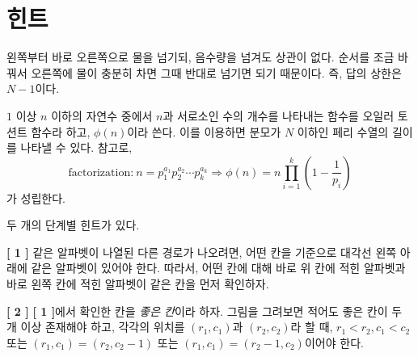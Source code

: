 \newpage

\section{힌트}

\begin{hint}
    
\end{hint}

\begin{hint}
    
\end{hint}

\begin{hint}
    
\end{hint}

\begin{hint}
    
\end{hint}

\begin{hint}
    왼쪽부터 바로 오른쪽으로 물을 넘기되, 음수량을 넘겨도 상관이 없다. 순서를 조금 바꿔서 오른쪽에 물이 충분히 차면 그때 반대로 넘기면 되기 때문이다. 즉, 답의 상한은 $N-1$이다.
\end{hint}

\begin{hint}
    $1$ 이상 $n$ 이하의 자연수 중에서 $n$과 서로소인 수의 개수를 나타내는 함수를 오일러 토션트 함수라 하고, $\phi(n)$이라 쓴다. 이를 이용하면 분모가 $N$ 이하인 페리 수열의 길이를 나타낼 수 있다. 참고로,
    $$\textrm{factorization:}~n = p_1^{a_1} p_2^{a_2} \cdots p_k^{a_k} \Longrightarrow \phi(n) = n \prod_{i=1}^k \left( 1 - \frac{1}{p_i} \right)$$
    가 성립한다.
\end{hint}

\begin{hint}
    두 개의 단계별 힌트가 있다.

    \textbf{[ 1 ]} \newline
    같은 알파벳이 나열된 다른 경로가 나오려면, 어떤 칸을 기준으로 대각선 왼쪽 아래에 같은 알파벳이 있어야 한다. 따라서, 어떤 칸에 대해 바로 위 칸에 적힌 알파벳과 바로 왼쪽 칸에 적힌 알파벳이 같은 칸을 먼저 확인하자.

    \textbf{[ 2 ]} \newline
    \textbf{[ 1 ]}에서 확인한 칸을 \textit{좋은 칸}이라 하자. 그림을 그려보면 적어도 좋은 칸이 두 개 이상 존재해야 하고, 각각의 위치를 $(r_1, c_1)$과 $(r_2, c_2)$라 할 때, $r_1 < r_2, c_1 < c_2$ 또는 $(r_1, c_1) = (r_2, c_2-1)$ 또는 $(r_1, c_1) = (r_2-1, c_2)$이어야 한다.
\end{hint}

